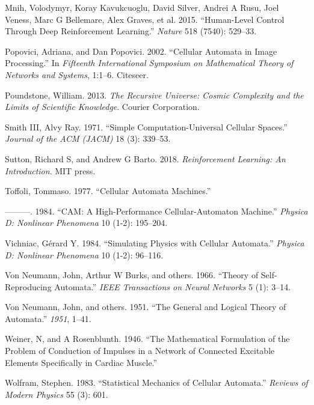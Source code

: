 \documentclass[
]{book}
\newlength{\cslhangindent}
\newenvironment{cslreferences}%
  {\setlength{\parindent}{0pt}%
  \everypar{\setlength{\hangindent}{\cslhangindent}}\ignorespaces}%
  {\par}
\begin{document}
\begin{cslreferences}
\leavevmode\hypertarget{ref-mnih2015human}{}%
Mnih, Volodymyr, Koray Kavukcuoglu, David Silver, Andrei A Rusu, Joel Veness, Marc G Bellemare, Alex Graves, et al. 2015. ``Human-Level Control Through Deep Reinforcement Learning.'' \emph{Nature} 518 (7540): 529--33.

\leavevmode\hypertarget{ref-popovici2002cellular}{}%
Popovici, Adriana, and Dan Popovici. 2002. ``Cellular Automata in Image Processing.'' In \emph{Fifteenth International Symposium on Mathematical Theory of Networks and Systems}, 1:1--6. Citeseer.

\leavevmode\hypertarget{ref-poundstone2013recursive}{}%
Poundstone, William. 2013. \emph{The Recursive Universe: Cosmic Complexity and the Limits of Scientific Knowledge}. Courier Corporation.

\leavevmode\hypertarget{ref-smith1971simple}{}%
Smith III, Alvy Ray. 1971. ``Simple Computation-Universal Cellular Spaces.'' \emph{Journal of the ACM (JACM)} 18 (3): 339--53.

\leavevmode\hypertarget{ref-sutton2018reinforcement}{}%
Sutton, Richard S, and Andrew G Barto. 2018. \emph{Reinforcement Learning: An Introduction}. MIT press.

\leavevmode\hypertarget{ref-toffoli1977cellular}{}%
Toffoli, Tommaso. 1977. ``Cellular Automata Machines.''

\leavevmode\hypertarget{ref-toffoli1984cam}{}%
---------. 1984. ``CAM: A High-Performance Cellular-Automaton Machine.'' \emph{Physica D: Nonlinear Phenomena} 10 (1-2): 195--204.

\leavevmode\hypertarget{ref-vichniac1984simulating}{}%
Vichniac, Gérard Y. 1984. ``Simulating Physics with Cellular Automata.'' \emph{Physica D: Nonlinear Phenomena} 10 (1-2): 96--116.

\leavevmode\hypertarget{ref-von1966theory}{}%
Von Neumann, John, Arthur W Burks, and others. 1966. ``Theory of Self-Reproducing Automata.'' \emph{IEEE Transactions on Neural Networks} 5 (1): 3--14.

\leavevmode\hypertarget{ref-von1951general}{}%
Von Neumann, John, and others. 1951. ``The General and Logical Theory of Automata.'' \emph{1951}, 1--41.

\leavevmode\hypertarget{ref-weiner1946mathematical}{}%
Weiner, N, and A Rosenblunth. 1946. ``The Mathematical Formulation of the Problem of Conduction of Impulses in a Network of Connected Excitable Elements Specifically in Cardiac Muscle.''

\leavevmode\hypertarget{ref-wolfram1983statistical}{}%
Wolfram, Stephen. 1983. ``Statistical Mechanics of Cellular Automata.'' \emph{Reviews of Modern Physics} 55 (3): 601.


\end{cslreferences}
\end{document}

